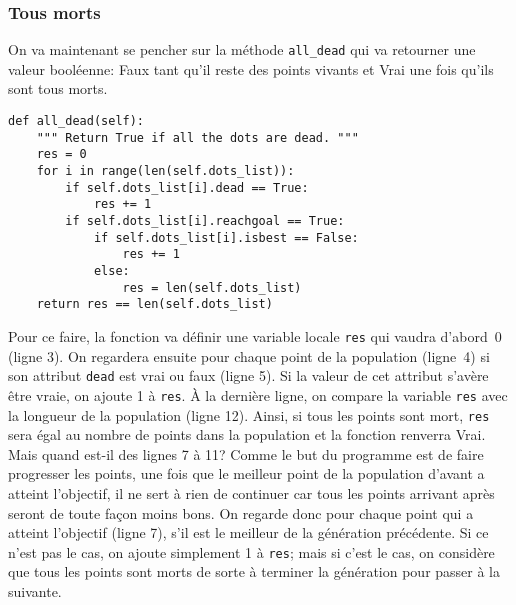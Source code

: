 \documentclass[12pt, a4paper, openany]{book}
\begin{document}
\subsubsection{Tous morts}
On va maintenant se pencher sur la méthode \verb'all_dead' qui va retourner une valeur booléenne: \og{}Faux\fg{} tant qu'il reste des points \og vivants\fg{} et \og{}Vrai\fg{} une fois qu'ils sont tous \og morts\fg{}.
\begin{verbatim}
def all_dead(self):
	""" Return True if all the dots are dead. """
	res = 0
	for i in range(len(self.dots_list)):
		if self.dots_list[i].dead == True:
			res += 1
		if self.dots_list[i].reachgoal == True:
			if self.dots_list[i].isbest == False:
				res	+= 1
			else:
				res = len(self.dots_list)
	return res == len(self.dots_list)
\end{verbatim}
Pour ce faire, la fonction va définir une variable locale \verb'res' qui vaudra d'abord~0 (ligne 3). On regardera ensuite pour chaque point de la population (ligne~4) si son attribut \verb'dead' est vrai ou faux (ligne 5). Si la valeur de cet attribut s'avère être \og{}vraie\fg{}, on ajoute 1 à \verb'res'. À la dernière ligne, on compare la variable \verb'res' avec la longueur de la population (ligne 12). Ainsi, si tous les points sont \og mort\fg{}, \verb'res' sera égal au nombre de points dans la population et la fonction renverra \og{}Vrai\fg{}. Mais quand est-il des lignes 7 à 11? Comme le but du programme est de faire progresser les points, une fois que le meilleur point de la population d'avant a atteint l'objectif, il ne sert à rien de continuer car tous les points arrivant après seront de toute façon moins bons. On regarde donc pour chaque point qui a atteint l'objectif (ligne 7), s'il est le meilleur de la génération précédente. Si ce n'est pas le cas, on ajoute simplement 1 à \verb'res'; mais si c'est le cas, on considère que tous les points sont \og morts\fg{} de sorte à terminer la génération pour passer à la suivante.
\end{document}
